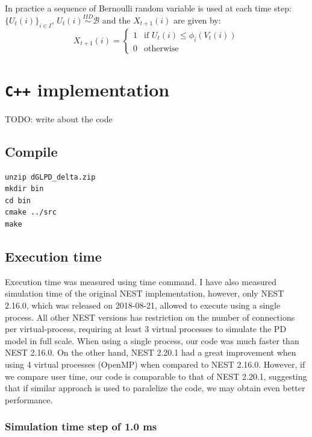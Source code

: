 \documentclass[11pt]{scrartcl}
\begin{document}
In practice a sequence of Bernoulli random variable is used at each time step: \(\{U_t(i)\}_{i \in I}\), \(U_t(i) \stackrel{IID}{\sim} \mathcal{B}\) and the \(X_{t+1}(i)\) are given by:
\begin{equation}\label{eq:X-evolution}
X_{t+1}(i) = \begin{cases}1 & \text{if } U_t(i) \le \phi_i\left(V_t(i)\right) \\ 0 & \text{otherwise}   \end{cases}
\end{equation}

\section{\texttt{C++} implementation}
\label{sec:orgd65e4e2}
TODO: write about the code

\subsection{Compile}
\label{sec:orgbcdc8ed}

\begin{verbatim}
unzip dGLPD_delta.zip
mkdir bin
cd bin
cmake ../src
make
\end{verbatim}

\subsection{Execution time}
\label{sec:org6b2f41c}

Execution time was measured using time command. I have also measured simulation time of the original NEST implementation, however, only NEST 2.16.0, which was released on 2018-08-21, allowed to execute using a single process. All other NEST versions has restriction on the number of connections per virtual-process, requiring at least 3 virtual processes to simulate the PD model in full scale. When using a single process, our code was much faster than NEST 2.16.0. On the other hand, NEST 2.20.1 had a great improvement when using 4 virtual processes (OpenMP) when compared to NEST 2.16.0. However, if we compare user time, our code is comparable to that of NEST 2.20.1, suggesting that if similar approach is used to paralelize the code, we may obtain even better performance.

\subsubsection{Simulation time step of 1.0 ms}
\label{sec:org82adef5}
\end{document}

